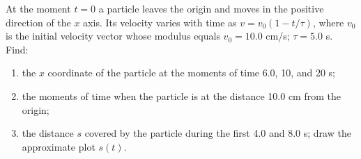 
\item At the moment \( t = 0 \) a particle leaves the origin and moves in the positive direction of the \( x \) axis. Its velocity varies with time as \( v = v_0 (1 - t/\tau) \), where \( v_0 \) is the initial velocity vector whose modulus equals \( v_0 = 10.0 \) cm/s; \( \tau = 5.0 \) s. Find:
    \begin{enumerate}
        \item the \( x \) coordinate of the particle at the moments of time 6.0, 10, and 20 s;
        \item the moments of time when the particle is at the distance 10.0 cm from the origin;
        \item the distance \( s \) covered by the particle during the first 4.0 and 8.0 s; draw the approximate plot \( s(t) \).
    \end{enumerate}

